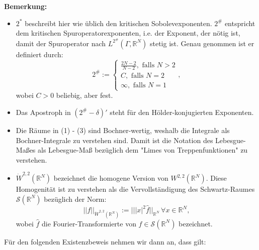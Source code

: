 \textbf{Bemerkung:} 
\begin{itemize}
    \item \(2^*\) beschreibt hier wie üblich den kritischen Sobolevexponenten. \(2^\#\) entspricht dem kritischen Spuroperatorexponenten, i.e. der Exponent, der nötig ist, damit der Spuroperator nach \(L^{2^\#}(\Gamma,\mathbb{R}^N)\) stetig ist. Genau genommen ist er definiert durch:
    \begin{equation}
        2^\# := \begin{cases}
            \frac{2N-2}{N-2}, \text{ falls }N>2 \\
            C, \text{ falls }N=2 \\
            \infty, \text{ falls }N=1
        \end{cases},
    \end{equation}
    wobei \(C > 0\) beliebig, aber fest.
    \item Das Apostroph in \((2^\# - \delta)'\) steht für den Hölder-konjugierten Exponenten.
    \item Die Räume in (1) - (3) sind Bochner-wertig, weshalb die Integrale als Bochner-Integrale zu verstehen sind. Damit ist die Notation des Lebesgue-Maßes als Lebesgue-Maß bezüglich dem "Limes von Treppenfunktionen" zu verstehen.
    \item \(\dot{W}^{2,2}(\mathbb{R}^N)\) bezeichnet die homogene Version von \(W^{2,2}(\mathbb{R}^N)\). Diese Homogenität ist zu verstehen als die Vervollständigung des Schwartz-Raumes \(\mathcal{S}(\mathbb{R}^N)\) bezüglich der Norm:
    \begin{equation}
        ||f||_{\dot{W}^{2,2}(\mathbb{R}^N)} := |||x|^2 \hat{f}||_{\mathbb{R}^N} \, \forall x \in \mathbb{R}^N,
    \end{equation}
    wobei \(\hat{f}\) die Fourier-Transformierte von \(f \in \mathcal{S}(\mathbb{R}^N)\) bezeichnet.
\end{itemize}
Für den folgenden Existenzbeweis nehmen wir dann an, dass gilt:
